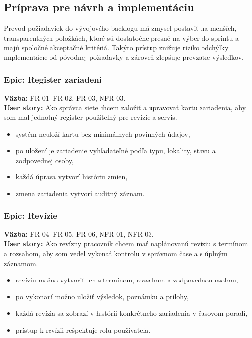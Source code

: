 \subsection{Príprava pre návrh a implementáciu}

Prevod požiadaviek do vývojového backlogu má zmysel postaviť na menších, transparentných položkách, ktoré sú dostatočne presné na výber do sprintu a majú spoločné akceptačné kritériá. Takýto prístup znižuje riziko odchýlky implementácie od pôvodnej požiadavky a zároveň zlepšuje prevzatie výsledkov.

\subsubsection*{Epic: Register zariadení}
\textbf{Väzba:} FR-01, FR-02, FR-03, NFR-03.\\
\textbf{User story:} Ako správca siete chcem založiť a upravovať kartu zariadenia, aby som mal jednotný register použiteľný pre revízie a servis.
\begin{itemize}
\item systém neuloží kartu bez minimálnych povinných údajov,
\item po uložení je zariadenie vyhľadateľné podľa typu, lokality, stavu a zodpovednej osoby,
\item každá úprava vytvorí históriu zmien,
\item zmena zariadenia vytvorí auditný záznam.
\end{itemize}

\subsubsection*{Epic: Revízie}
\textbf{Väzba:} FR-04, FR-05, FR-06, NFR-01, NFR-03.\\
\textbf{User story:} Ako revízny pracovník chcem mať naplánovanú revíziu s termínom a rozsahom, aby som vedel vykonať kontrolu v správnom čase a s úplným záznamom.
\begin{itemize}
\item revíziu možno vytvoriť len s termínom, rozsahom a zodpovednou osobou,
\item po vykonaní možno uložiť výsledok, poznámku a prílohy,
\item každá revízia sa zobrazí v histórii konkrétneho zariadenia v časovom poradí,
\item prístup k revízii rešpektuje rolu používateľa.
\end{itemize}

